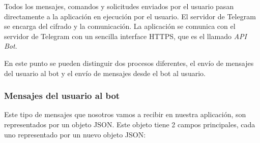 \documentclass[10pt,journal,compsoc]{IEEEtran}
\begin{document}
Todos los mensajes, comandos y solicitudes enviados por el usuario pasan 
directamente a la aplicación en ejecución por el usuario. El servidor de 
Telegram se encarga del cifrado y la comunicación. La aplicación se comunica con 
el servidor de Telegram con un sencilla interface HTTPS, que es el llamado \textit{API 
Bot}.

En este punto se pueden distinguir dos procesos diferentes, el envío de mensajes 
del usuario al bot y el envío de mensajes desde el bot al usuario.

\subsubsection{Mensajes del usuario al bot}
Este tipo de mensajes que nosotros vamos a recibir en nuestra aplicación, son 
representados por un objeto JSON. Este objeto tiene 2 campos principales, cada uno representado por
un nuevo objeto JSON:
\end{document}
